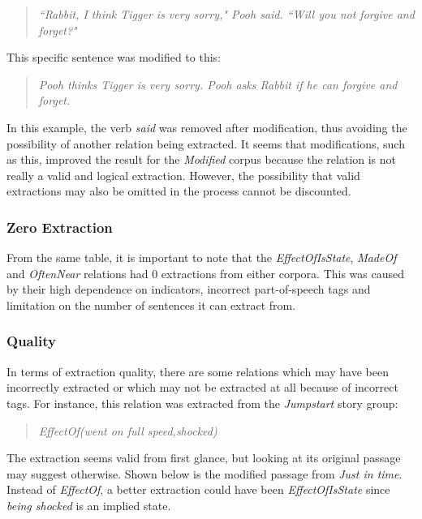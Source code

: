 \begin{verse}
\itshape
``Rabbit, I think Tigger is very sorry," Pooh said. ``Will you not forgive and forget?"
\end{verse}

This specific sentence was modified to this:

\begin{verse}
\itshape
Pooh thinks Tigger is very sorry. Pooh asks Rabbit if he can forgive and forget.
\end{verse}

In this example, the verb \textit{said} was removed after modification, thus avoiding the possibility of another relation being extracted. It seems that modifications, such as this, improved the result for the \textit{Modified} corpus because the relation is not really a valid and logical extraction. However, the possibility that valid extractions may also be omitted in the process cannot be discounted.

\subsubsection{Zero Extraction}

From the same table, it is important to note that the \textit{EffectOfIsState}, \textit{MadeOf} and \textit{OftenNear} relations had 0 extractions from either corpora. This was caused by their high dependence on indicators, incorrect part-of-speech tags and limitation on the number of sentences it can extract from. 

\subsubsection{Quality}

In terms of extraction quality, there are some relations which may have been incorrectly extracted or which may not be extracted at all because of incorrect tags. For instance, this relation was extracted from the \textit{Jumpstart} story group:

\begin{verse}
\itshape
EffectOf(went on full speed,shocked)
\end{verse}

The extraction seems valid from first glance, but looking at its original passage may suggest otherwise. Shown below is the modified passage from \textit{Just in time}. Instead of \textit{EffectOf}, a better extraction could have been \textit{EffectOfIsState} since \textit{being shocked} is an implied state. 

